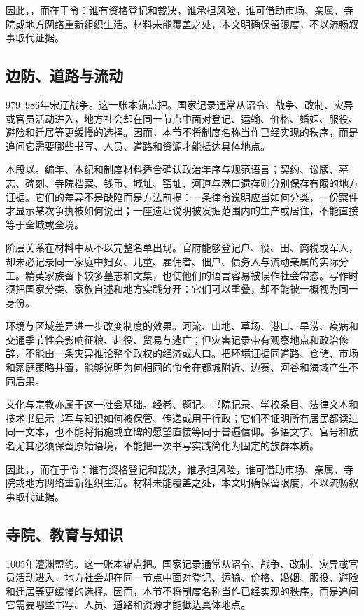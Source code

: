 因此，，而在于令：谁有资格登记和裁决，谁承担风险，谁可借助市场、亲属、寺院或地方网络重新组织生活。材料未能覆盖之处，本文明确保留限度，不以流畅叙事取代证据。

\subsection{边防、道路与流动}

979--986年宋辽战争。这一账本锚点把。国家记录通常从诏令、战争、改制、灾异或官员活动进入，地方社会却在同一节点中面对登记、运输、价格、婚姻、服役、避险和迁居等更缓慢的选择。因而，本节不将制度名称当作已经实现的秩序，而是追问它需要哪些书写、人员、道路和资源才能抵达具体地点。

本段以。编年、本纪和制度材料适合确认政治年序与规范语言；契约、讼牍、墓志、碑刻、寺院档案、钱币、城址、窑址、河道与港口遗存则分别保存有限的地方证据。它们的差异不是缺陷而是方法前提：一条律令说明应当如何分类，一份案件才显示某次争执被如何说出；一座遗址说明被发掘范围内的生产或居住，不能直接等于全城或全境。

阶层关系在材料中从不以完整名单出现。官府能够登记户、役、田、商税或军人，却未必记录同一家庭中妇女、儿童、雇佣者、佃户、债务人与流动亲属的实际分工。精英家族留下较多墓志和文集，也使他们的语言容易被误作社会常态。写作时须把国家分类、家族自述和地方实践分开：它们可以重叠，却不能被一概视为同一身份。

环境与区域差异进一步改变制度的效果。河流、山地、草场、港口、旱涝、疫病和交通季节性会影响征粮、赴役、贸易与逃亡；但灾害记录带有观察地点和政治修辞，不能由一条灾异推论整个政权的经济或人口。把环境证据同道路、仓储、市场和家庭策略并置，能够说明为何相同的命令在都城附近、边寨、河谷和海域产生不同后果。

文化与宗教亦属于这一社会基础。经卷、题记、书院记录、学校条目、法律文本和技术书显示书写与知识如何被保管、传递或用于行政；它们不证明所有居民都读过同一文本，也不能将捐施或立碑的愿望直接等同于普遍信仰。多语文字、官号和族名尤其必须保留原始语境，不能把一次书写实践简化为固定的族群本质。

因此，，而在于令：谁有资格登记和裁决，谁承担风险，谁可借助市场、亲属、寺院或地方网络重新组织生活。材料未能覆盖之处，本文明确保留限度，不以流畅叙事取代证据。

\subsection{寺院、教育与知识}

1005年澶渊盟约。这一账本锚点把。国家记录通常从诏令、战争、改制、灾异或官员活动进入，地方社会却在同一节点中面对登记、运输、价格、婚姻、服役、避险和迁居等更缓慢的选择。因而，本节不将制度名称当作已经实现的秩序，而是追问它需要哪些书写、人员、道路和资源才能抵达具体地点。

